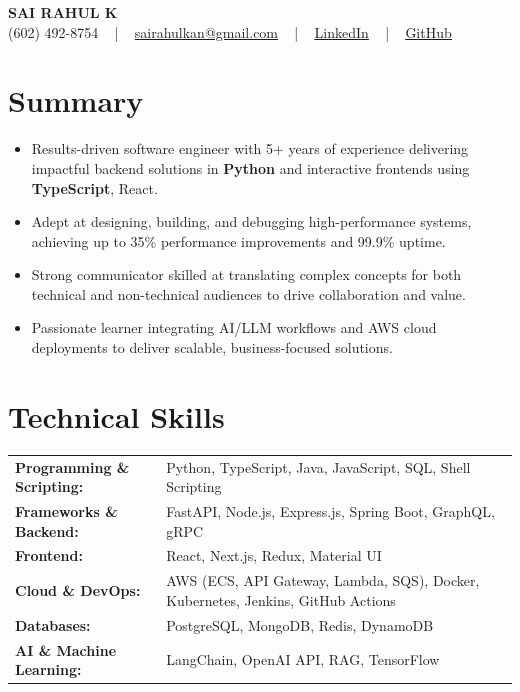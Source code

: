 \documentclass[letterpaper,11pt]{article}
\newcommand{\resumeItem}[1]{
  \item\footnotesize{
    {#1 \vspace{-2pt}}
  }
}
\newcommand{\resumeItemListStart}{\begin{itemize}[leftmargin=*]}
\newcommand{\resumeItemListEnd}{\end{itemize}\vspace{-5pt}}
\begin{document}
\begin{center}
    {\fontsize{14pt}{12pt}\selectfont \textbf{\MakeUppercase{Sai Rahul K}}}\\ \vspace{2pt}
    \fontsize{10pt}{12pt}\selectfont (602) 492-8754 ~ | ~ \href{mailto:sairahulkan@gmail.com}{sairahulkan@gmail.com} ~ | ~
    \href{https://www.linkedin.com/in/rq123/}{\color{blue}\underline{LinkedIn}} ~ | ~
    \href{https://github.com/kanrahuldo}{\color{blue}\underline{GitHub}}~
    \vspace{-8pt}
\end{center}

\section{Summary}
\fontsize{9pt}{10pt}\selectfont
\resumeItemListStart
    \resumeItem{Results-driven software engineer with 5+ years of experience delivering impactful backend solutions in \textbf{Python} and interactive frontends using \textbf{TypeScript}, React.}
    \resumeItem{Adept at designing, building, and debugging high-performance systems, achieving up to 35\% performance improvements and 99.9\% uptime.}
    \resumeItem{Strong communicator skilled at translating complex concepts for both technical and non-technical audiences to drive collaboration and value.}
    \resumeItem{Passionate learner integrating AI/LLM workflows and AWS cloud deployments to deliver scalable, business-focused solutions.}
\resumeItemListEnd
\vspace{-6pt}

\section{Technical Skills}
        \vspace{-14pt}
        \begin{table}[h]
            \fontsize{9pt}{10pt}\selectfont
            \begin{tabular}{p{0.3\linewidth} p{0.7\linewidth}}
                \textbf{Programming \& Scripting:} & Python, TypeScript, Java, JavaScript, SQL, Shell Scripting \\
                \textbf{Frameworks \& Backend:} & FastAPI, Node.js, Express.js, Spring Boot, GraphQL, gRPC \\
                \textbf{Frontend:} & React, Next.js, Redux, Material UI \\
                \textbf{Cloud \& DevOps:} & AWS (ECS, API Gateway, Lambda, SQS), Docker, Kubernetes, Jenkins, GitHub Actions \\
                \textbf{Databases:} & PostgreSQL, MongoDB, Redis, DynamoDB \\
                \textbf{AI \& Machine Learning:} & LangChain, OpenAI API, RAG, TensorFlow \\
            \end{tabular}
        \end{table}
    \vspace{-15pt}
\end{document}
